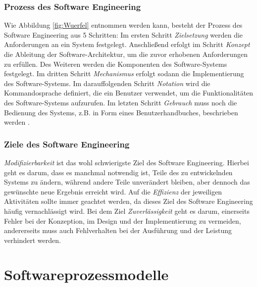  \subsubsection{Prozess des Software Engineering}

Wie Abbildung  \ref{fig:Wuerfel} entnommen werden kann, besteht der Prozess des Software Engineering aus 5 Schritten: Im ersten Schritt \textit{Zielsetzung} werden die Anforderungen an ein System festgelegt. Anschließend erfolgt im Schritt \textit{Konzept} die Ableitung der Software-Architektur, um die zuvor erhobenen Anforderungen zu erfüllen. Des Weiteren werden die Komponenten des Software-Systems festgelegt. Im dritten Schritt \textit {Mechanismus} erfolgt sodann die Implementierung des Software-Systems. Im darauffolgenden Schritt \textit{Notation} wird die Kommandosprache definiert, die ein Benutzer verwendet, um die Funktionalitäten des Software-Systems aufzurufen. Im letzten Schritt \textit{Gebrauch} muss noch die Bedienung des Systems, z.B. in Form eines Benutzerhandbuches, beschrieben werden \cite{ross1975software}.
  \subsubsection{Ziele des Software Engineering}

\textit{Modifizierbarkeit} ist das wohl schwierigste Ziel des Software Engineering. Hierbei geht es darum, dass es manchmal notwendig ist, Teile des zu entwickelnden Systems zu ändern, während andere Teile unverändert bleiben, aber dennoch das gewünschte neue Ergebnis erreicht wird. Auf die \textit{Effizienz} der jeweiligen Aktivitäten sollte immer geachtet werden, da dieses Ziel des Software Engineering häufig vernachlässigt wird. Bei dem Ziel \textit{Zuverlässigkeit} geht es darum, einerseits Fehler bei der Konzeption, im Design und der Implementierung zu vermeiden, andererseits muss auch Fehlverhalten bei der Ausführung und der Leistung verhindert werden.
 
\section{Softwareprozessmodelle}\label{sec:chapter.2: Softwareprozessmodelle}

